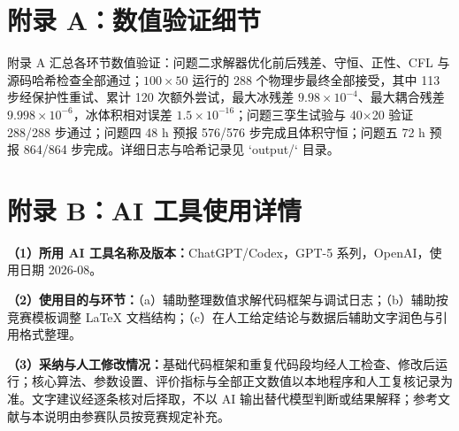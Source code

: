 \documentclass[UTF8]{ctexart}
\begin{document}
\newpage
\appendix
\section*{附录 A：数值验证细节}

附录 A 汇总各环节数值验证：问题二求解器优化前后残差、守恒、正性、CFL 与源码哈希检查全部通过；$100\times50$ 运行的 288 个物理步最终全部接受，其中 113 步经保护性重试、累计 120 次额外尝试，最大冰残差 $9.98\times10^{-4}$、最大耦合残差 $9.998\times10^{-6}$，冰体积相对误差 $1.5\times10^{-16}$；问题三孪生试验与 40×20 验证 288/288 步通过；问题四 48 h 预报 576/576 步完成且体积守恒；问题五 72 h 预报 864/864 步完成。详细日志与哈希记录见 `output/` 目录。

\section*{附录 B：AI 工具使用详情}

\par \textbf{（1）所用 AI 工具名称及版本：}ChatGPT/Codex，GPT-5 系列，OpenAI，使用日期 2026-08。
\par \textbf{（2）使用目的与环节：}（a）辅助整理数值求解代码框架与调试日志；（b）辅助按竞赛模板调整 LaTeX 文档结构；（c）在人工给定结论与数据后辅助文字润色与引用格式整理。
\par \textbf{（3）采纳与人工修改情况：}基础代码框架和重复代码段均经人工检查、修改后运行；核心算法、参数设置、评价指标与全部正文数值以本地程序和人工复核记录为准。文字建议经逐条核对后择取，不以 AI 输出替代模型判断或结果解释；参考文献与本说明由参赛队员按竞赛规定补充。
\end{document}
